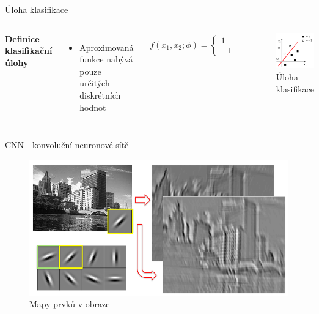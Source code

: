 \documentclass[aspectratio=1610]{beamer}
\begin{document}
\begin{frame}{Úloha klasifikace}
\begin{columns}
	\textbf{Definice klasifikační úlohy}
	\vspace{3mm}
	\begin{itemize}
		\item Aproximovaná funkce nabývá pouze určitých diskrétních hodnot
	\end{itemize}
	\begin{gather}
	f(x_1,x_2;\phi) = 
	\begin{cases}	
	1\\
	-1  
	\end{cases} 
	\end{gather}	
	\begin{figure}[h]
		\begin{center}
			\includegraphics[width=5cm, keepaspectratio]{linsep.png}
		\end{center}
		\caption{Úloha klasifikace} 	
	\end{figure}
\end{columns}	

\end{frame}
\begin{frame}{CNN - konvoluční neuronové sítě}
	\begin{figure}[h]
	\begin{center}
		\includegraphics[width=12cm, keepaspectratio]{maps2.png}
	\end{center}
	\caption{Mapy prvků v obraze} 	
\end{figure}
\end{frame}
\end{document}
